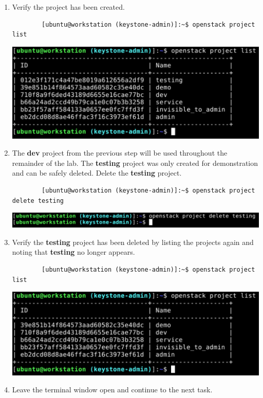 \documentclass[letterpaper, 12pt]{article}
\begin{document}
\begin{enumerate}
    \item Verify the project has been created.
    \begin{lstlisting}
        [ubuntu@workstation (keystone-admin)]:~$ openstack project list
    \end{lstlisting}

    \begin{center}
        \includegraphics[width=\linewidth]{images/part2/step5.png}
    \end{center}

    \item The \textbf{dev} project from the previous step will be used throughout the remainder of the lab. The
    \textbf{testing} project was only created for demonstration and can be safely deleted. Delete the \textbf{testing}
    project.
    \begin{lstlisting}
        [ubuntu@workstation (keystone-admin)]:~$ openstack project delete testing
    \end{lstlisting}

    \begin{center}
        \includegraphics[width=\linewidth]{images/part2/step6.png}
    \end{center}

    \item Verify the \textbf{testing} project has been deleted by listing the projects again and noting that
    \textbf{testing} no longer appears.
    \begin{lstlisting}
        [ubuntu@workstation (keystone-admin)]:~$ openstack project list
    \end{lstlisting}

    \begin{center}
        \includegraphics[width=\linewidth]{images/part2/step7.png}
    \end{center}

    \item Leave the terminal window open and continue to the next task.
\end{enumerate}
\end{document}
